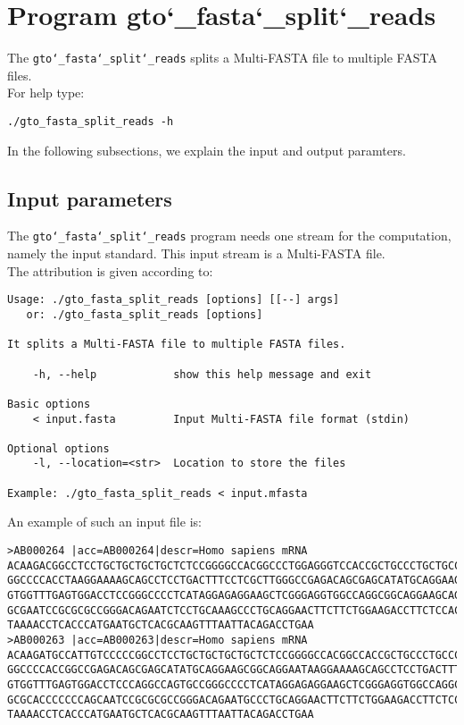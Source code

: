 \section{Program gto\char`_fasta\char`_split\char`_reads}
The \texttt{gto\char`_fasta\char`_split\char`_reads} splits a Multi-FASTA file to multiple FASTA files.\\
For help type:
\begin{lstlisting}
./gto_fasta_split_reads -h
\end{lstlisting}
In the following subsections, we explain the input and output paramters.

\subsection*{Input parameters}

The \texttt{gto\char`_fasta\char`_split\char`_reads} program needs one stream for the computation, namely the input standard. This input stream is a Multi-FASTA file.\\
The attribution is given according to:
\begin{lstlisting}
Usage: ./gto_fasta_split_reads [options] [[--] args]
   or: ./gto_fasta_split_reads [options]

It splits a Multi-FASTA file to multiple FASTA files.

    -h, --help            show this help message and exit

Basic options
    < input.fasta         Input Multi-FASTA file format (stdin)

Optional options
    -l, --location=<str>  Location to store the files

Example: ./gto_fasta_split_reads < input.mfasta
\end{lstlisting}
An example of such an input file is:
\begin{lstlisting}
>AB000264 |acc=AB000264|descr=Homo sapiens mRNA 
ACAAGACGGCCTCCTGCTGCTGCTGCTCTCCGGGGCCACGGCCCTGGAGGGTCCACCGCTGCCCTGCTGCCATTGTCCCC
GGCCCCACCTAAGGAAAAGCAGCCTCCTGACTTTCCTCGCTTGGGCCGAGACAGCGAGCATATGCAGGAAGCGGCAGGAA
GTGGTTTGAGTGGACCTCCGGGCCCCTCATAGGAGAGGAAGCTCGGGAGGTGGCCAGGCGGCAGGAAGCAGGCCAGTGCC
GCGAATCCGCGCGCCGGGACAGAATCTCCTGCAAAGCCCTGCAGGAACTTCTTCTGGAAGACCTTCTCCACCCCCCCAGC
TAAAACCTCACCCATGAATGCTCACGCAAGTTTAATTACAGACCTGAA
>AB000263 |acc=AB000263|descr=Homo sapiens mRNA 
ACAAGATGCCATTGTCCCCCGGCCTCCTGCTGCTGCTGCTCTCCGGGGCCACGGCCACCGCTGCCCTGCCCCTGGAGGGT
GGCCCCACCGGCCGAGACAGCGAGCATATGCAGGAAGCGGCAGGAATAAGGAAAAGCAGCCTCCTGACTTTCCTCGCTTG
GTGGTTTGAGTGGACCTCCCAGGCCAGTGCCGGGCCCCTCATAGGAGAGGAAGCTCGGGAGGTGGCCAGGCGGCAGGAAG
GCGCACCCCCCCAGCAATCCGCGCGCCGGGACAGAATGCCCTGCAGGAACTTCTTCTGGAAGACCTTCTCCTCCTGCAAA
TAAAACCTCACCCATGAATGCTCACGCAAGTTTAATTACAGACCTGAA
\end{lstlisting}

